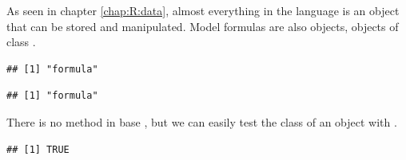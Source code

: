 \documentclass[krantz2]{krantz}\usepackage{knitr}
\begin{document}
As seen in chapter \ref{chap:R:data}, almost everything in the \Rlang language is an object that can be stored and manipulated. Model formulas are also objects, objects of class .

\begin{knitrout}\footnotesize
{}\color{fgcolor}\begin{kframe}
\begin{alltt}
 \hlopt{~} 
\end{alltt}
\begin{verbatim}
## [1] "formula"
\end{verbatim}
\end{kframe}
\end{knitrout}

\begin{knitrout}\footnotesize
{}\color{fgcolor}\begin{kframe}
\begin{alltt}
 \hlkwb{<-}  \hlopt{~} 
\end{alltt}
\begin{verbatim}
## [1] "formula"
\end{verbatim}
\end{kframe}
\end{knitrout}

There is no method  in base \Rlang, but we can easily test the class of an object with .

\begin{knitrout}\footnotesize
{}\color{fgcolor}\begin{kframe}
\begin{alltt}
 \hlstd{)}
\end{alltt}
\begin{verbatim}
## [1] TRUE
\end{verbatim}
\end{kframe}
\end{knitrout}
\end{document}
